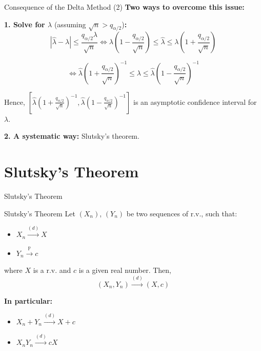 \documentclass[aspectratio=169]{beamer}
\begin{document}
\begin{frame}{Consequence of the Delta Method (2)}
\textbf{Two ways to overcome this issue:}

\vspace{0.3cm}

\textbf{1. Solve for $\lambda$} (assuming $\sqrt{n} > q_{\alpha/2}$)\textbf{:}
\[|\hat{\lambda} - \lambda| \leq \frac{q_{\alpha/2}\lambda}{\sqrt{n}} \Leftrightarrow \lambda\left(1 - \frac{q_{\alpha/2}}{\sqrt{n}}\right) \leq \hat{\lambda} \leq \lambda\left(1 + \frac{q_{\alpha/2}}{\sqrt{n}}\right)\]

\[\Leftrightarrow \hat{\lambda}\left(1 + \frac{q_{\alpha/2}}{\sqrt{n}}\right)^{-1} \leq \lambda \leq \hat{\lambda}\left(1 - \frac{q_{\alpha/2}}{\sqrt{n}}\right)^{-1}\]

Hence, $\left[\hat{\lambda}\left(1 + \frac{q_{\alpha/2}}{\sqrt{n}}\right)^{-1}, \hat{\lambda}\left(1 - \frac{q_{\alpha/2}}{\sqrt{n}}\right)^{-1}\right]$ is an asymptotic confidence interval for $\lambda$.

\vspace{0.3cm}

\textbf{2. A systematic way:} Slutsky's theorem.
\end{frame}

\section{Slutsky's Theorem}

\begin{frame}{Slutsky's Theorem}
\begin{block}{Slutsky's Theorem}
Let $(X_n)$, $(Y_n)$ be two sequences of r.v., such that:
\begin{itemize}
    \item[(i)] $X_n \xrightarrow{(d)} X$
    \item[(ii)] $Y_n \xrightarrow{\mathbb{P}} c$
\end{itemize}
where $X$ is a r.v. and $c$ is a given real number. Then,
\[(X_n, Y_n) \xrightarrow{(d)} (X, c)\]
\end{block}

\vspace{0.3cm}

\textbf{In particular:}
\begin{itemize}
    \item $X_n + Y_n \xrightarrow{(d)} X + c$
    \item $X_nY_n \xrightarrow{(d)} cX$
\end{itemize}
\end{frame}
\end{document}
